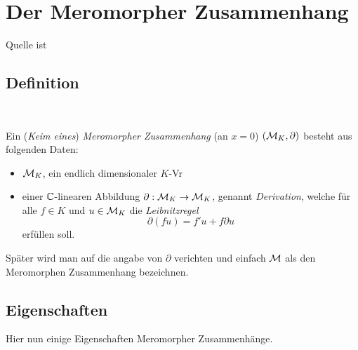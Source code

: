 
\chapter{Der Meromorpher Zusammenhang}
Quelle ist \cite{sabbah_cimpa90}
\section{Definition}~

\begin{defn}
  Ein (\emph{Keim eines}) \emph{Meromorpher Zusammenhang} (an $x=0$)
  $(\mathcal{M}_K,\partial)$ besteht aus folgenden Daten:
  \begin{itemize}
    \item $\mathcal{M}_K$, ein endlich dimensionaler $K$-Vr
    \item einer $\mathbb{C}$-linearen Abbildung $\partial:\mathcal{M}_K\rightarrow \mathcal{M}_K$, genannt
      \emph{Derivation}, welche für alle $f\in K$ und $u\in \mathcal{M}_K$ die
      \emph{Leibnitzregel}
      \begin{equation}\label{eq:Leibnitzregel}
        \partial(fu)=f'u+f\partial u
      \end{equation}
      erfüllen soll.
  \end{itemize}
\end{defn}

\begin{bem}
  Später wird man auf die angabe von $\partial$ verichten und einfach $\mathcal{M}$ als
  den Meromorphen Zusammenhang bezeichnen.
\end{bem}

\section{Eigenschaften}
Hier nun einige Eigenschaften Meromorpher Zusammenhänge.

